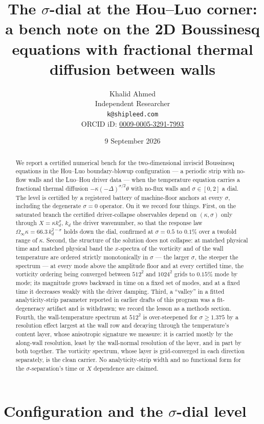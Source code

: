 \documentclass[11pt,a4paper]{article}
\title{The \texorpdfstring{$\sigma$}{sigma}-dial at the Hou--Luo corner: a bench note on the 2D Boussinesq equations with fractional thermal diffusion between walls}
\author{Khalid Ahmed\\[2pt]
\small Independent Researcher\\
\small \texttt{k@shipleed.com}\\
\small ORCID iD: \href{https://orcid.org/0009-0005-3291-7993}{0009-0005-3291-7993}}
\date{9 September 2026}
\newcommand{\kd}{k_d}
\begin{document}
\maketitle

\begin{abstract}
We report a certified numerical bench for the two-dimensional inviscid Boussinesq equations in the Hou--Luo boundary-blowup configuration --- a periodic strip with no-flow walls and the Luo--Hou driver data --- when the temperature equation carries a fractional thermal diffusion $-\kappa(-\Delta)^{\sigma/2}\theta$ with no-flux walls and $\sigma\in[0,2]$ a dial. The level is certified by a registered battery of machine-floor anchors at every $\sigma$, including the degenerate $\sigma=0$ operator. On it we record four things. First, on the saturated branch the certified driver-collapse observables depend on $(\kappa,\sigma)$ only through $X=\kappa\kd^\sigma$, $\kd$ the driver wavenumber, so that the response law $\Omega_\infty\kappa=66.3\,\kd^{2-\sigma}$ holds down the dial, confirmed at $\sigma=0.5$ to $0.1\%$ over a twofold range of $\kappa$. Second, the structure of the solution does not collapse: at matched physical time and matched physical band the $x$-spectra of the vorticity and of the wall temperature are ordered strictly monotonically in $\sigma$ --- the larger $\sigma$, the steeper the spectrum --- at every mode above the amplitude floor and at every certified time, the vorticity ordering being converged between $512^2$ and $1024^2$ grids to $0.15\%$ mode by mode; its magnitude grows backward in time on a fixed set of modes, and at a fixed time it decreases weakly with the driver damping. Third, a ``valley'' in a fitted analyticity-strip parameter reported in earlier drafts of this program was a fit-degeneracy artifact and is withdrawn; we record the lesson as a methods section. Fourth, the wall-temperature spectrum at $512^2$ is over-steepened for $\sigma\ge1.375$ by a resolution effect largest at the wall row and decaying through the temperature's content layer, whose anisotropic signature we measure: it is carried mostly by the along-wall resolution, least by the wall-normal resolution of the layer, and in part by both together. The vorticity spectrum, whose layer is grid-converged in each direction separately, is the clean carrier. No analyticity-strip width and no functional form for the $\sigma$-separation's time or $X$ dependence are claimed.
\end{abstract}

\section{Configuration and the \texorpdfstring{$\sigma$}{sigma}-dial level}\label{sec:config}
\end{document}
